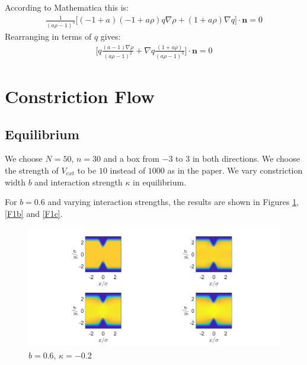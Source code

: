 \documentclass[11pt, a4paper]{article}
\theoremstyle{definition}
\newcommand{\n}{\mathbf{n}}
\begin{document}
According to Mathematica this is:
\begin{align*}
	\frac{1}{(a \rho -1)^3}\bigg[(-1 + a) (-1 + a \rho) q \nabla \rho + (1 + a \rho) \nabla q \bigg]\cdot \n = 0
\end{align*}
Rearranging in terms of $q$ gives:
\begin{align*}
	\bigg[q\frac{(a-1)  \nabla \rho}{(a \rho -1)^2}+ \nabla q\frac{(1 + a \rho) }{(a \rho -1)^3}  \bigg]\cdot \n = 0
\end{align*}




\section{Constriction Flow}
\subsection{Equilibrium}
We choose $N = 50$, $n =30$ and a box from $-3$ to $3$ in both directions. We choose the strength of $V_{ext}$ to be $10$ instead of $1000$ as in the paper.
We vary constriction width $b$ and interaction strength $\kappa$ in equilibrium.

For $b = 0.6$ and varying interaction strengths, the results are shown in Figures \ref{F1a}, \ref{F1b} and \ref{F1c}.
\begin{figure}[h]
	\centering
	\includegraphics[scale=0.4]{Con1.png}
	\caption{$b = 0.6$, $\kappa =-0.2$} 
	\label{F1a}
\end{figure}
\end{document}
